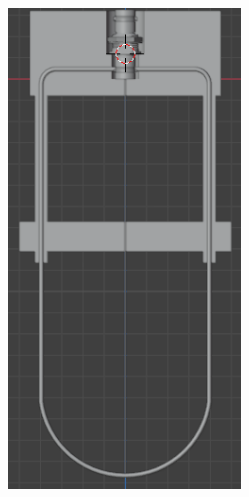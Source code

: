 \begin{figure}[!ht]
	\begin{minipage}[c]{0.5\textwidth}
		\begin{subfigure}{\textwidth}
			\centering
			\includegraphics[width=0.678\textwidth]{Figures/31_04_2025/Modelo_3D_1}
			\captionsetup{width=0.8\textwidth}
			\subcaption{}
		\end{subfigure}
	\end{minipage}\begin{minipage}[c]{0.49\textwidth}
		\begin{subfigure}{\textwidth}
			\centering

\end{subfigure}
\end{minipage}
\end{figure}
